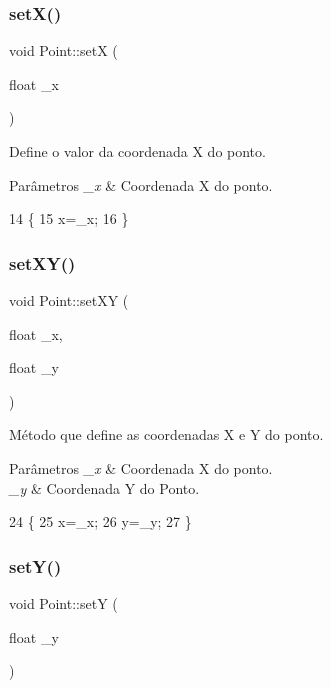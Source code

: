 \subsubsection{\texorpdfstring{set\+X()}{setX()}}
{\footnotesize\ttfamily void Point\+::setX (\begin{DoxyParamCaption}\item[{float}]{\+\_\+x }\end{DoxyParamCaption})}



Define o valor da coordenada X do ponto. 


\begin{DoxyParams}{Parâmetros}
{\em \+\_\+x} & Coordenada X do ponto. \\
\hline
\end{DoxyParams}

\begin{DoxyCode}
14 \{
15     x=\_x;
16 \}
\end{DoxyCode}
\mbox{\label{class_point_ab5385c6d9bfa841e641e4709fc9f14cc}} 
\subsubsection{\texorpdfstring{set\+X\+Y()}{setXY()}}
{\footnotesize\ttfamily void Point\+::set\+XY (\begin{DoxyParamCaption}\item[{float}]{\+\_\+x,  }\item[{float}]{\+\_\+y }\end{DoxyParamCaption})}



Método que define as coordenadas X e Y do ponto. 


\begin{DoxyParams}{Parâmetros}
{\em \+\_\+x} & Coordenada X do ponto. \\
\hline
{\em \+\_\+y} & Coordenada Y do Ponto. \\
\hline
\end{DoxyParams}

\begin{DoxyCode}
24 \{
25     x=\_x;
26     y=\_y;
27 \}
\end{DoxyCode}
\mbox{\label{class_point_a9868c4601b0ea0c2d0de20fe41ee0e49}} 
\subsubsection{\texorpdfstring{set\+Y()}{setY()}}
{\footnotesize\ttfamily void Point\+::setY (\begin{DoxyParamCaption}\item[{float}]{\+\_\+y }\end{DoxyParamCaption})}



